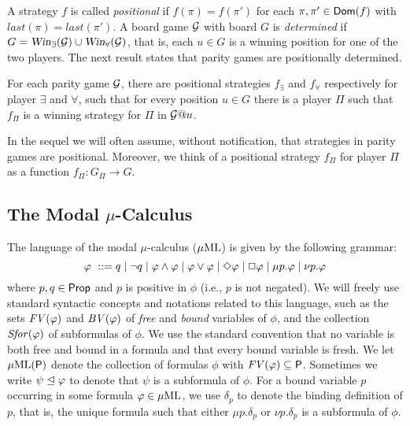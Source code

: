 A strategy $f$ is called \emph{positional} if $f(\pi) = f(\pi')$ for
each $\pi,\pi'\in \mathsf{Dom}(f)$ with $\mathit{last}(\pi) = 
\mathit{last}(\pi')$.
A board game $\mathcal{G}$ with board $G$ is \emph{determined} if $G = \text{\sl Win}_{\exists}(\mathcal{G}) \cup \text{\sl Win}_{\forall}(\mathcal{G})$, that is, each $u \in G$ is a winning position for one of the two players.
%
The next result states that parity games are positionally determined.

\begin{fact}
\label{THM_posDet_ParityGames}
For each parity game $\mathcal{G}$, there are positional strategies $f_{\exists}$
and $f_{\forall}$ respectively for player $\exists$ and $\forall$, such that
for every position $u \in G$ there is a player $\Pi$ such that $f_{\Pi}$ is a
winning strategy for $\Pi$ in $\mathcal{G}@u$.
\end{fact}
%
In the sequel we will often assume, without notification, that strategies in
parity games are positional. 
Moreover, we think of a positional strategy $f_\Pi$ for player $\Pi$ as a 
function $f_\Pi:G_\Pi\to G$.

\subsection{The Modal $\mu$-Calculus}
\label{subsec:mu}

The language of the modal $\mu$-calculus ($\mu\mathrm{ML}$) is given by the following 
grammar:
%
\begin{equation*}
    \varphi\ \mathrel{::=}  q \mid \neg q \mid \varphi \land \varphi \mid
    \varphi \lor \varphi \mid  \Diamond \varphi \mid \Box \varphi \mid
    \mu p.\varphi \mid \nu p.\varphi
\end{equation*}
%
where $p,q \in \mathsf{Prop}$ and $p$ is positive in $\phi$ (i.e., $p$ is not
negated).
We will freely use standard syntactic concepts and notations related to this
language, such as the sets $\mathit{FV}(\varphi)$ and $\mathit{BV}(\varphi)$ of \emph{free} and 
\emph{bound} variables of $\phi$, and the collection $\mathit{Sfor}(\varphi)$ of subformulas
of $\phi$.
We use the standard convention that no variable is both free and bound in a
formula and that every bound variable is fresh.
We let $\mu\mathrm{ML}(\mathsf{P})$ denote the collection of formulas $\phi$ with $\mathit{FV}(\varphi)
\subseteq \mathsf{P}$.
Sometimes we write $\psi \trianglelefteq \varphi$ to denote that $\psi$ is a subformula
of $\phi$.
%
For a bound variable $p$ occurring in some formula $\varphi \in \mu\mathrm{ML}$, we use
$\delta_p$ to denote the binding definition of $p$, that is, the unique formula
such that either $\mu p.\delta_p$ or $\nu p.\delta_p$ is a subformula of 
$\phi$.

